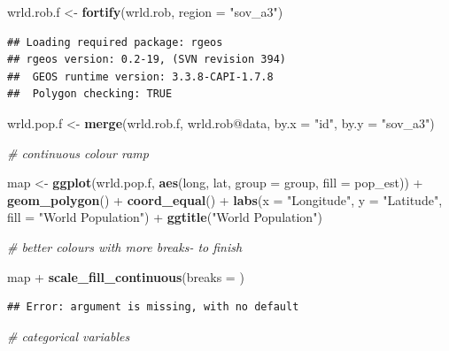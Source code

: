 \documentclass[]{article}
\newenvironment{Shaded}{}{}
\newcommand{\KeywordTok}[1]{\textcolor[rgb]{0.00,0.44,0.13}{\textbf{{#1}}}}
\newcommand{\DataTypeTok}[1]{\textcolor[rgb]{0.56,0.13,0.00}{{#1}}}
\newcommand{\StringTok}[1]{\textcolor[rgb]{0.25,0.44,0.63}{{#1}}}
\newcommand{\CommentTok}[1]{\textcolor[rgb]{0.38,0.63,0.69}{\textit{{#1}}}}
\newcommand{\NormalTok}[1]{{#1}}
\begin{document}
\begin{Shaded}
\begin{Highlighting}[]
\NormalTok{wrld.rob.f <- }\KeywordTok{fortify}\NormalTok{(wrld.rob, }\DataTypeTok{region =} \StringTok{"sov_a3"}\NormalTok{)}
\end{Highlighting}
\end{Shaded}
\begin{verbatim}
## Loading required package: rgeos
## rgeos version: 0.2-19, (SVN revision 394)
##  GEOS runtime version: 3.3.8-CAPI-1.7.8 
##  Polygon checking: TRUE
\end{verbatim}
\begin{Shaded}
\begin{Highlighting}[]

\NormalTok{wrld.pop.f <- }\KeywordTok{merge}\NormalTok{(wrld.rob.f, wrld.rob@data, }\DataTypeTok{by.x =} \StringTok{"id"}\NormalTok{, }\DataTypeTok{by.y =} \StringTok{"sov_a3"}\NormalTok{)}
\end{Highlighting}
\end{Shaded}
\begin{Shaded}
\begin{Highlighting}[]
\CommentTok{# continuous colour ramp}

\NormalTok{map <- }\KeywordTok{ggplot}\NormalTok{(wrld.pop.f, }\KeywordTok{aes}\NormalTok{(long, lat, }\DataTypeTok{group =} \NormalTok{group, }\DataTypeTok{fill =} \NormalTok{pop_est)) + }\KeywordTok{geom_polygon}\NormalTok{() + }
    \KeywordTok{coord_equal}\NormalTok{() + }\KeywordTok{labs}\NormalTok{(}\DataTypeTok{x =} \StringTok{"Longitude"}\NormalTok{, }\DataTypeTok{y =} \StringTok{"Latitude"}\NormalTok{, }\DataTypeTok{fill =} \StringTok{"World Population"}\NormalTok{) + }
    \KeywordTok{ggtitle}\NormalTok{(}\StringTok{"World Population"}\NormalTok{)}

\CommentTok{# better colours with more breaks- to finish}

\NormalTok{map + }\KeywordTok{scale_fill_continuous}\NormalTok{(}\DataTypeTok{breaks =} \NormalTok{)}
\end{Highlighting}
\end{Shaded}
\begin{verbatim}
## Error: argument is missing, with no default
\end{verbatim}
\begin{Shaded}
\begin{Highlighting}[]

\CommentTok{# categorical variables}
\end{Highlighting}
\end{Shaded}
\end{document}
